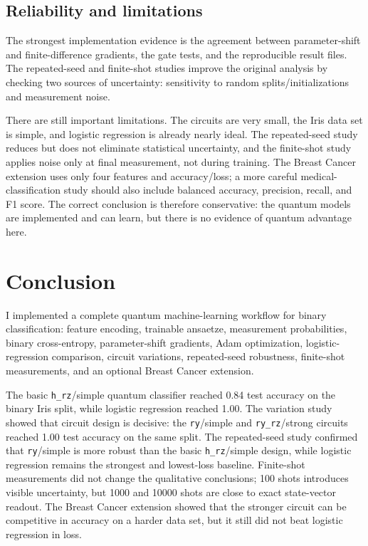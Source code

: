 \documentclass[10pt,a4paper]{article}
\newcommand{\code}[1]{\texttt{#1}}
\begin{document}
\subsection{Reliability and limitations}
The strongest implementation evidence is the agreement between parameter-shift and finite-difference gradients, the gate tests, and the reproducible result files. The repeated-seed and finite-shot studies improve the original analysis by checking two sources of uncertainty: sensitivity to random splits/initializations and measurement noise.

There are still important limitations. The circuits are very small, the Iris data set is simple, and logistic regression is already nearly ideal. The repeated-seed study reduces but does not eliminate statistical uncertainty, and the finite-shot study applies noise only at final measurement, not during training. The Breast Cancer extension uses only four features and accuracy/loss; a more careful medical-classification study should also include balanced accuracy, precision, recall, and F1 score. The correct conclusion is therefore conservative: the quantum models are implemented and can learn, but there is no evidence of quantum advantage here.

\section{Conclusion}\label{sec:conclusion}
I implemented a complete quantum machine-learning workflow for binary classification: feature encoding, trainable ansaetze, measurement probabilities, binary cross-entropy, parameter-shift gradients, Adam optimization, logistic-regression comparison, circuit variations, repeated-seed robustness, finite-shot measurements, and an optional Breast Cancer extension.

The basic \code{h\_rz}/simple quantum classifier reached 0.84 test accuracy on the binary Iris split, while logistic regression reached 1.00. The variation study showed that circuit design is decisive: the \code{ry}/simple and \code{ry\_rz}/strong circuits reached 1.00 test accuracy on the same split. The repeated-seed study confirmed that \code{ry}/simple is more robust than the basic \code{h\_rz}/simple design, while logistic regression remains the strongest and lowest-loss baseline. Finite-shot measurements did not change the qualitative conclusions; 100 shots introduces visible uncertainty, but 1000 and 10000 shots are close to exact state-vector readout. The Breast Cancer extension showed that the stronger circuit can be competitive in accuracy on a harder data set, but it still did not beat logistic regression in loss.
\end{document}
